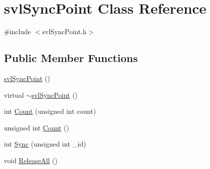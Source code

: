 \hypertarget{classsvl_sync_point}{\section{svl\-Sync\-Point Class Reference}
\label{classsvl_sync_point}
}


{\ttfamily \#include $<$svl\-Sync\-Point.\-h$>$}

\subsection*{Public Member Functions}
\begin{DoxyCompactItemize}
\item 
\hyperlink{classsvl_sync_point_ab2a4020c42e6fdaf84d04d0b4baba545}{svl\-Sync\-Point} ()
\item 
virtual \hyperlink{classsvl_sync_point_ad96101df194cb353997a0228024ef3fc}{$\sim$svl\-Sync\-Point} ()
\item 
int \hyperlink{classsvl_sync_point_a69f1de302c63ad27ad8473ec13b03c0b}{Count} (unsigned int count)
\item 
unsigned int \hyperlink{classsvl_sync_point_a944ae6070d0eb453098a311cc0c762f6}{Count} ()
\item 
int \hyperlink{classsvl_sync_point_aaa9eca266838ecd2e967da0bd5e0aaf1}{Sync} (unsigned int \-\_\-id)
\item 
void \hyperlink{classsvl_sync_point_abab84acf781c8401f2d5c4f163b68306}{Release\-All} ()
\end{DoxyCompactItemize}


